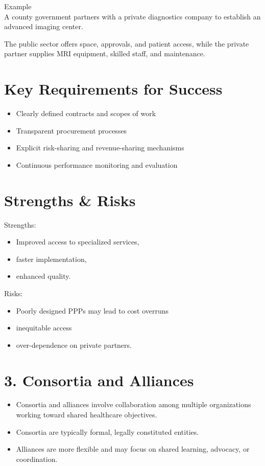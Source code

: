 \documentclass[10pt]{article}
\begin{document}
Example\\
A county government partners with a private diagnostics company to establish an advanced imaging center.

The public sector offers space, approvals, and patient access, while the private partner supplies MRI equipment, skilled staff, and maintenance.

\section*{Key Requirements for Success}
\begin{itemize}
  \item Clearly defined contracts and scopes of work
  \item Transparent procurement processes
  \item Explicit risk-sharing and revenue-sharing mechanisms
  \item Continuous performance monitoring and evaluation
\end{itemize}

\section*{Strengths \& Risks}
Strengths:

\begin{itemize}
  \item Improved access to specialized services,
  \item faster implementation,
  \item enhanced quality.
\end{itemize}

Risks:

\begin{itemize}
  \item Poorly designed PPPs may lead to cost overruns
  \item inequitable access
  \item over-dependence on private partners.
\end{itemize}

\section*{3. Consortia and Alliances}
\begin{itemize}
  \item Consortia and alliances involve collaboration among multiple organizations working toward shared healthcare objectives.
  \item Consortia are typically formal, legally constituted entities.
  \item Alliances are more flexible and may focus on shared learning, advocacy, or coordination.
\end{itemize}
\end{document}
